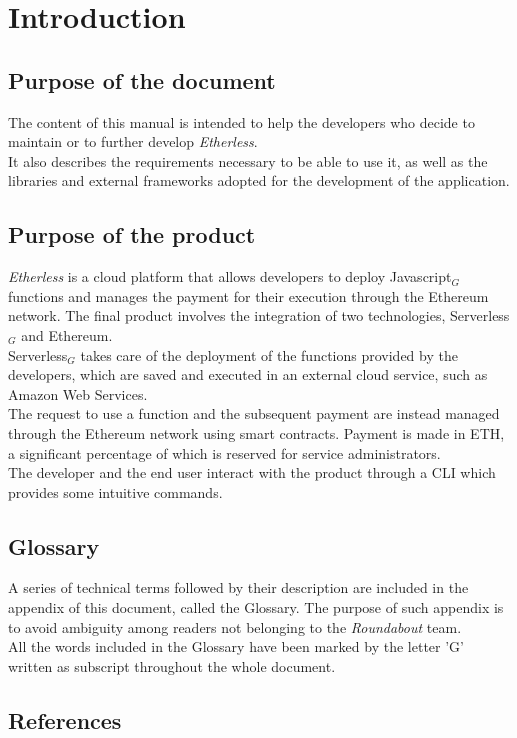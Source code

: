 \section{Introduction}

	\subsection{Purpose of the document}
	The content of this manual is intended to help the developers who decide to maintain or to further develop \textit{Etherless}. \\
	It also describes the requirements necessary to be able to use it, as well as the libraries and external frameworks adopted for the development of the application.
	
	
	\subsection{Purpose of the product}
	\textit{Etherless} is a cloud platform that allows developers to deploy Javascript$_{G}$ functions and manages the payment for their execution through the Ethereum network.
	The final product involves the integration of two technologies, Serverless$_{G}$ and Ethereum.\\
	Serverless$_{G}$ takes care of the deployment of the functions provided by the developers, which are saved and executed in an external cloud service, such as Amazon Web Services.\\
	The request to use a function and the subsequent payment are instead managed through the Ethereum network using smart contracts. Payment is made in ETH, a significant percentage of which is reserved for service administrators.\\
	The developer and the end user interact with the product through a CLI which provides some intuitive commands.

	
	\subsection{Glossary}
	A series of technical terms followed by their description are included in the appendix of this document, called the Glossary. The purpose of such appendix is to avoid ambiguity among readers not belonging to the \textit{Roundabout} team.\\
	All the words included in the Glossary have been marked by the letter 'G' written as subscript throughout the whole document.
	
	
	\subsection{References}
	
